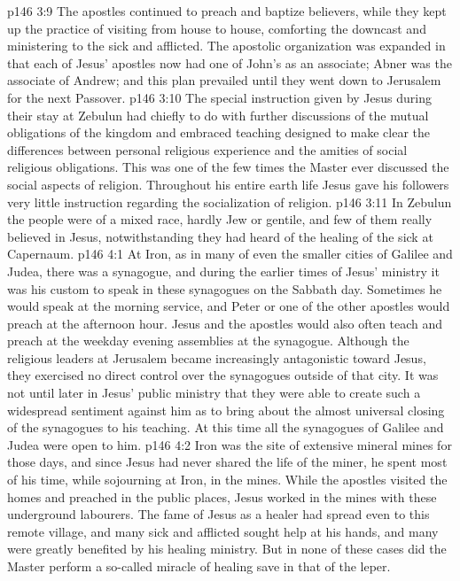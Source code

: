 \vs p146 3:9 \pc The apostles continued to preach and baptize believers, while they kept up the practice of visiting from house to house, comforting the downcast and ministering to the sick and afflicted. The apostolic organization was expanded in that each of Jesus’ apostles now had one of John’s as an associate; Abner was the associate of Andrew; and this plan prevailed until they went down to Jerusalem for the next Passover.
\vs p146 3:10 \pc The special instruction given by Jesus during their stay at Zebulun had chiefly to do with further discussions of the mutual obligations of the kingdom and embraced teaching designed to make clear the differences between personal religious experience and the amities of social religious obligations. This was one of the few times the Master ever discussed the social aspects of religion. Throughout his entire earth life Jesus gave his followers very little instruction regarding the socialization of religion.
\vs p146 3:11 In Zebulun the people were of a mixed race, hardly Jew or gentile, and few of them really believed in Jesus, notwithstanding they had heard of the healing of the sick at Capernaum.
\vs p146 4:1 At Iron, as in many of even the smaller cities of Galilee and Judea, there was a synagogue, and during the earlier times of Jesus’ ministry it was his custom to speak in these synagogues on the Sabbath day. Sometimes he would speak at the morning service, and Peter or one of the other apostles would preach at the afternoon hour. Jesus and the apostles would also often teach and preach at the weekday evening assemblies at the synagogue. Although the religious leaders at Jerusalem became increasingly antagonistic toward Jesus, they exercised no direct control over the synagogues outside of that city. It was not until later in Jesus’ public ministry that they were able to create such a widespread sentiment against him as to bring about the almost universal closing of the synagogues to his teaching. At this time all the synagogues of Galilee and Judea were open to him.
\vs p146 4:2 Iron was the site of extensive mineral mines for those days, and since Jesus had never shared the life of the miner, he spent most of his time, while sojourning at Iron, in the mines. While the apostles visited the homes and preached in the public places, Jesus worked in the mines with these underground labourers. The fame of Jesus as a healer had spread even to this remote village, and many sick and afflicted sought help at his hands, and many were greatly benefited by his healing ministry. But in none of these cases did the Master perform a so\hyp{}called miracle of healing save in that of the leper.
